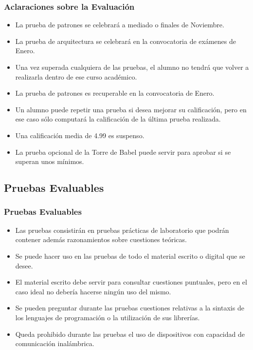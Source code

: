 \documentclass[animated,a4paper,slidestop,xcolor=pst,blue]{beamer}
\begin{document}
\begin{frame}[c]
	\frametitle{Aclaraciones sobre la Evaluación}
	\begin{itemize}
        \item<2-> La prueba de patrones se celebrará a mediado o finales de Noviembre.
        \item<3-> La prueba de arquitectura se celebrará en la convocatoria de exámenes de Enero.
        \item<4-> Una vez superada cualquiera de las pruebas, el alumno no tendrá que volver a realizarla dentro de ese curso académico.
        \item<5-> La prueba de patrones es recuperable en la convocatoria de Enero.
        \item<6-> Un alumno puede repetir una prueba si desea mejorar su calificación, pero en ese caso sólo computará la calificación de la última prueba realizada.
		\item<7-> Una calificación media de 4.99 es suspenso.
        \item<8-> La prueba opcional de la Torre de Babel puede servir para aprobar si se superan unos mínimos.
	\end{itemize}
\end{frame}

\subsection{Pruebas Evaluables}

\begin{frame}[c]
    \frametitle{Pruebas Evaluables}
	\begin{itemize}[<+->]
	   \item Las pruebas consistirán en pruebas prácticas de laboratorio que podrán contener además razonamientos sobre cuestiones teóricas.
       \item Se puede hacer uso en las pruebas de todo el material escrito o digital que se desee.
       \item El material escrito debe servir para consultar cuestiones puntuales, pero en el caso ideal no debería hacerse ningún uso del mismo.
       \item Se pueden preguntar durante las pruebas cuestiones relativas a la sintaxis de los lenguajes de programación o la utilización de sus librerías.
       \item Queda prohibido durante las pruebas el uso de dispositivos con capacidad de comunicación inalámbrica.
	\end{itemize}
\end{frame}
\end{document}
